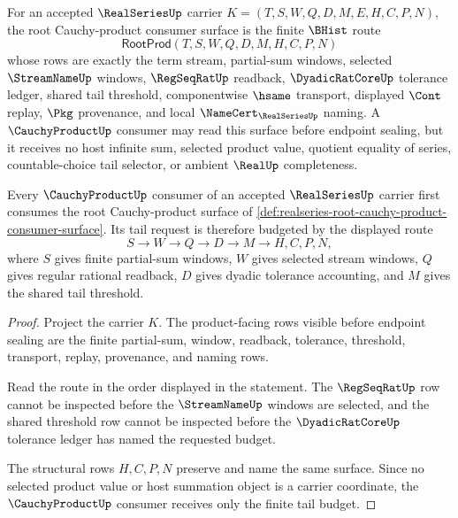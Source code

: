 \begin{definition}\label{def:realseries-root-cauchy-product-consumer-surface}
For an accepted $\RealSeriesUp$ carrier $K=(T,S,W,Q,D,M,E,H,C,P,N)$, the root Cauchy-product consumer surface is the finite $\BHist$ route
$$
\mathsf{RootProd}(T,S,W,Q,D,M,H,C,P,N)
$$
whose rows are exactly the term stream, partial-sum windows, selected $\StreamNameUp$ windows, $\RegSeqRatUp$ readback, $\DyadicRatCoreUp$ tolerance ledger, shared tail threshold, componentwise $\hsame$ transport, displayed $\Cont$ replay, $\Pkg$ provenance, and local $\NameCert_{\RealSeriesUp}$ naming. A $\CauchyProductUp$ consumer may read this surface before endpoint sealing, but it receives no host infinite sum, selected product value, quotient equality of series, countable-choice tail selector, or ambient $\RealUp$ completeness.
\end{definition}

\begin{theorem}\label{thm:realseries-root-product-tail-budget}
Every $\CauchyProductUp$ consumer of an accepted $\RealSeriesUp$ carrier first consumes the root Cauchy-product surface of \autoref{def:realseries-root-cauchy-product-consumer-surface}. Its tail request is therefore budgeted by the displayed route
$$
S \longrightarrow W \longrightarrow Q \longrightarrow D \longrightarrow M \longrightarrow H,C,P,N,
$$
where $S$ gives finite partial-sum windows, $W$ gives selected stream windows, $Q$ gives regular rational readback, $D$ gives dyadic tolerance accounting, and $M$ gives the shared tail threshold.
\end{theorem}
\begin{proof}
Project the carrier $K$. The product-facing rows visible before endpoint sealing are the finite partial-sum, window, readback, tolerance, threshold, transport, replay, provenance, and naming rows.

Read the route in the order displayed in the statement. The $\RegSeqRatUp$ row cannot be inspected before the $\StreamNameUp$ windows are selected, and the shared threshold row cannot be inspected before the $\DyadicRatCoreUp$ tolerance ledger has named the requested budget.

The structural rows $H,C,P,N$ preserve and name the same surface. Since no selected product value or host summation object is a carrier coordinate, the $\CauchyProductUp$ consumer receives only the finite tail budget.
\end{proof}

